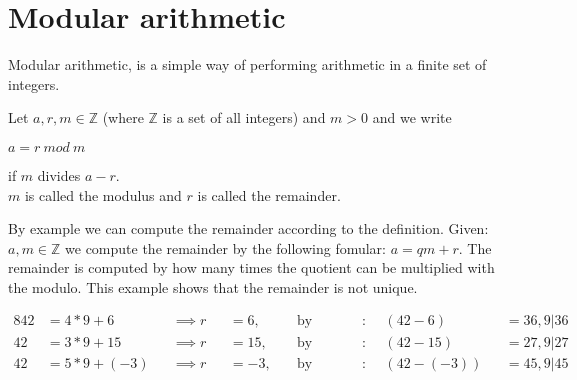 \section{Modular arithmetic}
Modular arithmetic, is a simple way of performing arithmetic in a finite set of integers.

\begin{defi}
Let \begin{math} a, r,m \in  \mathbb{Z}\end{math} (where \begin{math} \mathbb{Z}\end{math} is a set of all integers) and \begin{math} m > 0\end{math} and we write  
\begin{center} \begin{math} a = r \ mod \ m\end{math} \end{center}
if \begin{math}m \end{math} divides \begin{math} a - r \end{math}.\\
\begin{math}m \end{math} is called the modulus and \begin{math}r \end{math} is called the remainder.
\end{defi}

 By example we can compute the remainder according to the definition. Given: \begin{math} a, m \in \mathbb{Z} \end{math} we compute the remainder by the following fomular:  \begin{math} a = qm +r \end{math}. The remainder is computed by how many times the quotient can be multiplied with the modulo. This example shows that the remainder is not unique.

\noindent
\begin{alignat*}{8}
42 &= 4 * 9 +6 &&\implies r &&= 6 ,\ &&\text{by \ definition}: \  &&(42-6) &&= 36 ,  9| 36 \\
42 &= 3 * 9 +15 &&\implies r &&= 15 ,\ &&\text{by \ definition}: \ &&(42-15) &&= 27 ,  9| 27 \\
42 &= 5 * 9 +(-3) &&\implies r &&= -3 ,\ &&\text{by \ definition}: \ &&(42-(-3)) &&= 45 ,  9| 45 
\end{alignat*}




